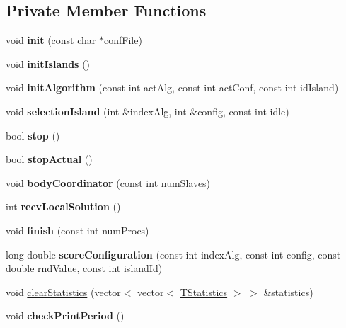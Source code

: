 \subsection*{Private Member Functions}
\begin{DoxyCompactItemize}
\item 
\mbox{\label{classCoordinatorIsland_a8ef31c84fa543fc7a60e0e68b8f6d16e}} 
void {\bfseries init} (const char $\ast$conf\+File)
\item 
\mbox{\label{classCoordinatorIsland_af663b28b853073e2f5d179d19a28011f}} 
void {\bfseries init\+Islands} ()
\item 
\mbox{\label{classCoordinatorIsland_a2637f5bc00df9693cf5b7bacdc9bc1fc}} 
void {\bfseries init\+Algorithm} (const int act\+Alg, const int act\+Conf, const int id\+Island)
\item 
\mbox{\label{classCoordinatorIsland_a78f74dd68e95864e0691e8a40b295e78}} 
void {\bfseries selection\+Island} (int \&index\+Alg, int \&config, const int idle)
\item 
\mbox{\label{classCoordinatorIsland_a09cbbefa720138188302b340dd13bf69}} 
bool {\bfseries stop} ()
\item 
\mbox{\label{classCoordinatorIsland_a9d6dfa8f43d2a2653eae788704b6e9e0}} 
bool {\bfseries stop\+Actual} ()
\item 
\mbox{\label{classCoordinatorIsland_aec34100c82a854a961d39b881ef47145}} 
void {\bfseries body\+Coordinator} (const int num\+Slaves)
\item 
\mbox{\label{classCoordinatorIsland_a33f052e140a7c18109c35d58a12c82e4}} 
int {\bfseries recv\+Local\+Solution} ()
\item 
\mbox{\label{classCoordinatorIsland_a5f05ee8573c776baa181e6e34fc31bec}} 
void {\bfseries finish} (const int num\+Procs)
\item 
\mbox{\label{classCoordinatorIsland_a52a6719766e8389a5f46ab6467df10bd}} 
long double {\bfseries score\+Configuration} (const int index\+Alg, const int config, const double rnd\+Value, const int island\+Id)
\item 
void \mbox{\hyperlink{classCoordinatorIsland_a25c1872d7c83a2e2855d2db4ada2f06d}{clear\+Statistics}} (vector$<$ vector$<$ \mbox{\hyperlink{structTStatistics}{T\+Statistics}} $>$ $>$ \&statistics)
\item 
\mbox{\label{classCoordinatorIsland_a2e24a4b695b66ac53ea6176adeae64c0}} 
void {\bfseries check\+Print\+Period} ()
\end{DoxyCompactItemize}

